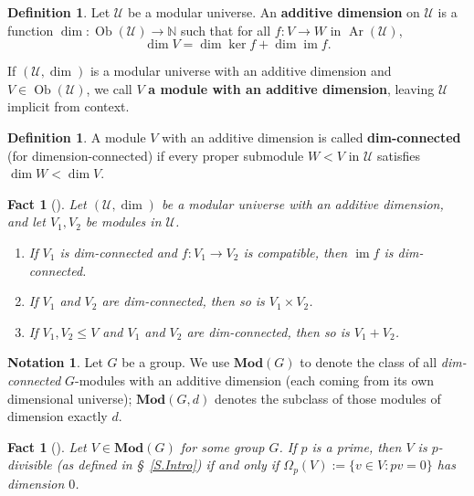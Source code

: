 \documentclass[a4paper, 11pt]{amsart}
\theoremstyle{plain}
\newtheorem{fact}[theorem]{Fact}
\theoremstyle{definition}
\newtheorem{definition}[theorem]{Definition}
\newtheorem*{notation}{Notation}
\theoremstyle{remark}
\newcommand{\cU}{\mathcal{U}}
\DeclareMathOperator{\Ar}{Ar}
\DeclareMathOperator{\Ob}{Ob}
\DeclareMathOperator{\im}{im}
\newcommand{\Mod}{\mathbf{Mod}}
\newcommand{\bN}{\mathbb{N}}
\begin{document}
\begin{definition}\label{d.ModAddDim}
Let $\cU$ be a modular universe.
An \textbf{additive dimension} on $\cU$ is a function $\dim\colon \Ob(\cU) \to \bN$ such that for all $f\colon V \to W$ in $\Ar(\cU)$, 
\[\dim V = \dim \ker f + \dim \im f.\]

If $(\cU, \dim)$ is a modular universe with an additive dimension and $V \in \Ob(\cU)$, we call $V$ \textbf{a module with an additive dimension}, leaving $\cU$ implicit from context. 
\end{definition}


\begin{definition}
A module $V$ with an additive dimension is called \textbf{dim-connected} (for dimension-connected) if every proper submodule $W<V$ in $\cU$ satisfies $\dim W < \dim V$.
\end{definition}

\begin{fact}[{\cite[Connectedness Properties]{CDW23}}]\label{fact.ConnectednessProps}
Let $(\cU, \dim)$ be a modular universe with an additive dimension, and let $V_1,V_2$ be modules in $\cU$.
\begin{enumerate}
\item
If $V_1$ is dim-connected and $f\colon V_1 \to V_2$ is compatible, then $\im f$ is dim-connected.
\item
If $V_1$ and $V_2$ are dim-connected, then so is $V_1 \times V_2$.
\item
If $V_1, V_2 \leq V$ and $V_1$ and $V_2$ are dim-connected, then so is $V_1+V_2$.
\end{enumerate}
\end{fact} 


\begin{notation}
Let $G$ be a group. We use $\Mod(G)$ to denote the class of all \emph{dim-connected} $G$-modules with an additive dimension (each coming from its own dimensional universe); $\Mod(G, d)$ denotes the subclass of those modules of dimension exactly $d$.
\end{notation}




\begin{fact}[{\cite[Divisibility Properties]{CDW23}}]\label{fact.Divisibility}
Let $V\in \Mod(G)$ for some group $G$. If $p$ is a prime, then $V$ is $p$-divisible (as defined in \S~\ref{S.Intro}) if and only if $\Omega_p(V) := \{v \in V: pv = 0\}$ has dimension $0$. %
\end{fact}
\end{document}
